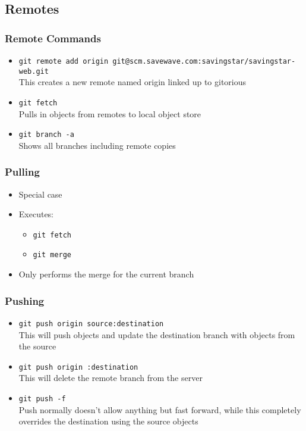 \subsection{Remotes}

\begin{frame}
  \frametitle{Remote Commands}
  \begin{itemize}
  \item \texttt{git remote add origin git@scm.savewave.com:savingstar/savingstar-web.git}
    \\ This creates a new remote named origin linked up to gitorious
    \pause
  \item \texttt{git fetch}
    \\ Pulls in objects from remotes to local object store
    \pause
  \item \texttt{git branch -a}
    \\ Shows all branches including remote copies
  \end{itemize}
\end{frame}

\begin{frame}
  \frametitle{Pulling}
  \begin{itemize}
  \item Special case
  \item Executes:
    \begin{itemize}
    \item \texttt{git fetch}
    \item \texttt{git merge}
    \end{itemize}
  \item Only performs the merge for the current branch
  \end{itemize}
\end{frame}

\begin{frame}
  \frametitle{Pushing}
  \begin{itemize}
    \item \texttt{git push origin source:destination} \\ This will push objects
      and update the destination branch with objects from the source
      \pause
    \item \texttt{git push origin :destination} \\ This will delete the remote
      branch from the server
      \pause
    \item \texttt{git push -f} \\ Push normally doesn't allow anything but fast
      forward, while this completely overrides the destination using the source
      objects
  \end{itemize}
\end{frame}

